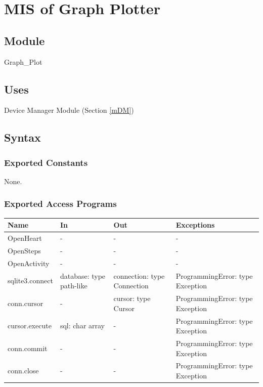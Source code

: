\documentclass[12pt, titlepage]{article}
\begin{document}
\newpage

\section{MIS of Graph Plotter} \label{mGP} 

\subsection{Module}

Graph\_Plot

\subsection{Uses}

Device Manager Module (Section \ref{mDM})

\subsection{Syntax}

\subsubsection{Exported Constants}

None.

\subsubsection{Exported Access Programs}

\begin{center}
\begin{tabular}{p{3cm} p{3cm} p{2cm} p{4cm}}
\hline
\textbf{Name} & \textbf{In} & \textbf{Out} & \textbf{Exceptions} \\
\hline
OpenHeart & - & - & - \\
OpenSteps & - & - & - \\
OpenActivity & - & - & - \\
sqlite3.connect & database: type path-like & connection: type Connection & ProgrammingError: type Exception \\
conn.cursor & - & cursor: type Cursor & ProgrammingError: type Exception \\
cursor.execute & sql: char array & - & ProgrammingError: type Exception \\
conn.commit & - & - & ProgrammingError: type Exception \\
conn.close & - & - & ProgrammingError: type Exception \\
\hline
\end{tabular}
\end{center}
\end{document}
